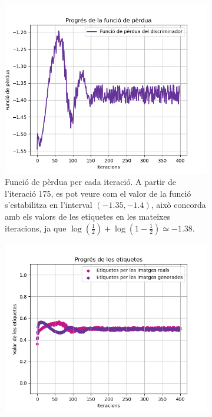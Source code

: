 \begin{figure}
	\label{fig:labels_loss_400}
	\begin{subfigure}{0.45\textwidth}
		\includegraphics[width=\linewidth]{figures/model/loss_plot.png}
		\caption{Funció de pèrdua per cada iteració. A partir de l'iteració 175, es pot veure com el valor de la funció s'estabilitza en l'interval $(-1.35, -1.4)$, això concorda amb els valors de les etiquetes en les mateixes iteracions, ja que $\log(\frac{1}{2}) + \log(1-\frac{1}{2}) \simeq -1.38$.}\label{fig:loss_400}
	\end{subfigure}%
	\hspace*{\fill}   %
	\begin{subfigure}{0.45\textwidth}
		\includegraphics[width=\linewidth]{figures/model/labels_plot.png}

\end{subfigure}
\end{figure}

